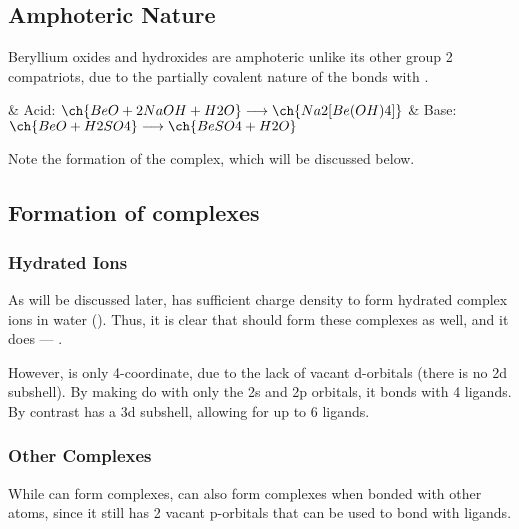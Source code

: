 

		\subsection{Amphoteric Nature}

			Beryllium oxides and hydroxides are amphoteric unlike its other group 2 compatriots, due to the partially
			covalent nature of the bonds with .

			\begin{bulletlist}
				& Acid:\tabto{15mm} $\ch{BeO + 2 NaOH + H2O} \longrightarrow \ch{Na2[Be(OH)4]}$
				& Base:\tabto{15mm} $\ch{BeO + H2SO4} \longrightarrow \ch{BeSO4 + H2O}$
			\end{bulletlist}

			Note the formation of the  complex, which will be discussed below.



		\subsection{Formation of  complexes}

			\subsubsection{Hydrated Ions}

				As will be discussed later,  has sufficient charge density to form hydrated complex
				ions in water (). Thus, it is clear that  should form these complexes
				as well, and it does --- .

				However,  is only 4-coordinate, due to the lack of vacant d-orbitals (there is no 2d
				subshell). By making do with only the 2s and 2p orbitals, it bonds with 4 ligands. By contrast
				 has a 3d subshell, allowing for up to 6 ligands.



			\pagebreak
			\subsubsection{Other Complexes}

				While  can form complexes,  can also form complexes when bonded with other
				atoms, since it still has 2 vacant p-orbitals that can be used to bond with ligands.

